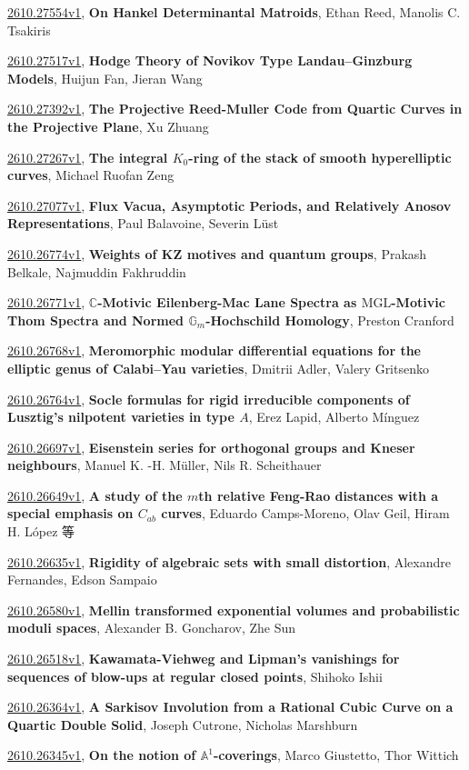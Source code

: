\documentclass[9pt, a4paper]{article}
\theoremstyle{plain}
\theoremstyle{definition}
\theoremstyle{remark}
\newcommand{\arxiv}[3]{\href{https://arxiv.org/abs/#1}{#1}, \textbf{\textcolor{arxivblue}{#2}}, #3}
\begin{document}
\arxiv{2610.27554v1}{On Hankel Determinantal Matroids}{Ethan Reed, Manolis C. Tsakiris}

\arxiv{2610.27517v1}{Hodge Theory of Novikov Type Landau--Ginzburg Models}{Huijun Fan, Jieran Wang}

\arxiv{2610.27392v1}{The Projective Reed-Muller Code from Quartic Curves in the Projective Plane}{Xu Zhuang}

\arxiv{2610.27267v1}{The integral $K_0$-ring of the stack of smooth hyperelliptic curves}{Michael Ruofan Zeng}

\arxiv{2610.27077v1}{Flux Vacua, Asymptotic Periods, and Relatively Anosov Representations}{Paul Balavoine, Severin Lüst}

\arxiv{2610.26774v1}{Weights of KZ motives and quantum groups}{Prakash Belkale, Najmuddin Fakhruddin}

\arxiv{2610.26771v1}{$\mathbb{C}$-Motivic Eilenberg-Mac Lane Spectra as $\mathrm{MGL}$-Motivic Thom Spectra and Normed $\mathbb{G}_m$-Hochschild Homology}{Preston Cranford}

\arxiv{2610.26768v1}{Meromorphic modular differential equations for the elliptic genus of Calabi--Yau varieties}{Dmitrii Adler, Valery Gritsenko}

\arxiv{2610.26764v1}{Socle formulas for rigid irreducible components of Lusztig's nilpotent varieties in type $A$}{Erez Lapid, Alberto Mínguez}

\arxiv{2610.26697v1}{Eisenstein series for orthogonal groups and Kneser neighbours}{Manuel K. -H. Müller, Nils R. Scheithauer}

\arxiv{2610.26649v1}{A study of the $m$th relative Feng-Rao distances with a special emphasis on $C_{ab}$ curves}{Eduardo Camps-Moreno, Olav Geil, Hiram H. López 等}

\arxiv{2610.26635v1}{Rigidity of algebraic sets with small distortion}{Alexandre Fernandes, Edson Sampaio}

\arxiv{2610.26580v1}{Mellin transformed exponential volumes and probabilistic moduli spaces}{Alexander B. Goncharov, Zhe Sun}

\arxiv{2610.26518v1}{Kawamata-Viehweg and Lipman's vanishings for sequences of blow-ups at regular closed points}{Shihoko Ishii}

\arxiv{2610.26364v1}{A Sarkisov Involution from a Rational Cubic Curve on a Quartic Double Solid}{Joseph Cutrone, Nicholas Marshburn}

\arxiv{2610.26345v1}{On the notion of $\mathbb{A}^1$-coverings}{Marco Giustetto, Thor Wittich}
\end{document}
